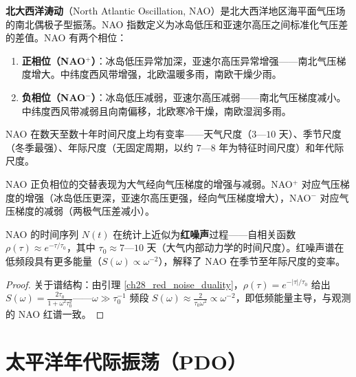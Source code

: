 \begin{definition}\label{def:nao}
\textbf{北大西洋涛动}（North Atlantic Oscillation, NAO）是北大西洋地区海平面气压场的南北偶极子型振荡。NAO 指数定义为冰岛低压和亚速尔高压之间标准化气压差的差值。NAO 有两个相位：
\begin{enumerate}[label=(\roman*)]
    \item \textbf{正相位（NAO$^+$）}：冰岛低压异常加深，亚速尔高压异常增强——南北气压梯度增大。中纬度西风带增强，北欧温暖多雨，南欧干燥少雨。
    \item \textbf{负相位（NAO$^-$）}：冰岛低压减弱，亚速尔高压减弱——南北气压梯度减小。中纬度西风带减弱且向南偏移，北欧寒冷干燥，南欧湿润多雨。
\end{enumerate}
NAO 在数天至数十年时间尺度上均有变率——天气尺度（$3$—$10$ 天）、季节尺度（冬季最强）、年际尺度（无固定周期，以约 $7$—$8$ 年为特征时间尺度）和年代际尺度。
\end{definition}

\begin{proposition}\label{prop:nao_divergence}
NAO 正负相位的交替表现为大气经向气压梯度的增强与减弱。NAO$^+$ 对应气压梯度的增强（冰岛低压更深，亚速尔高压更强，经向气压梯度增大），NAO$^-$ 对应气压梯度的减弱（两极气压差减小）。

NAO 的时间序列 $N(t)$ 在统计上近似为\textbf{红噪声}过程——自相关函数 $\rho(\tau) \approx e^{-\tau/\tau_0}$，其中 $\tau_0 \approx 7$—$10$ 天（大气内部动力学的时间尺度）。红噪声谱在低频段具有更多能量（$S(\omega) \propto \omega^{-2}$），解释了 NAO 在季节至年际尺度的变率。
\end{proposition}

\begin{proof}
关于谱结构：由引理 \ref{ch28_red_noise_duality}，$\rho(\tau) = e^{-|\tau|/\tau_0}$ 给出 $S(\omega) = \frac{2\tau_0}{1+\omega^2\tau_0^2}$——$\omega \gg \tau_0^{-1}$ 频段 $S(\omega) \approx \frac{2}{\tau_0\omega^2} \propto \omega^{-2}$，即低频能量主导，与观测的 NAO 红谱一致。
\end{proof}

\section{太平洋年代际振荡（PDO）}

